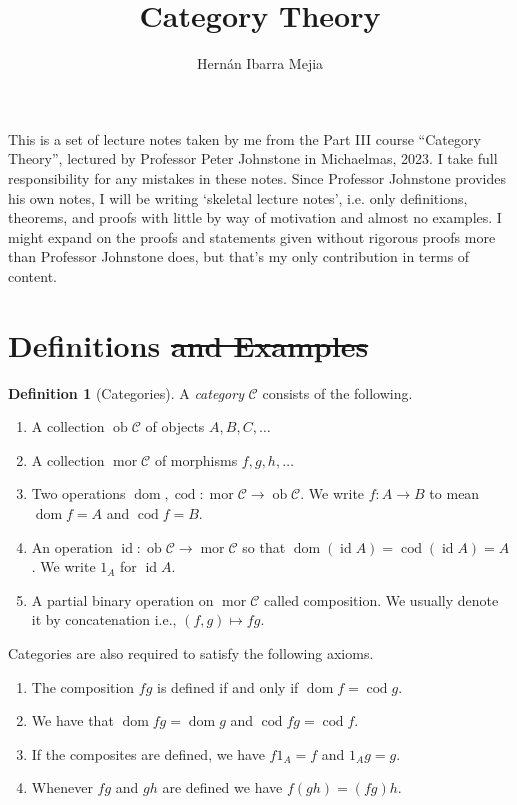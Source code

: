 \documentclass{report}
\DeclareMathOperator{\id}{id}
\DeclareMathOperator{\ob}{ob}
\DeclareMathOperator{\mor}{mor}
\DeclareMathOperator{\dom}{dom}
\DeclareMathOperator{\cod}{cod}
\theoremstyle{definition}
\theoremstyle{plain}
\theoremstyle{definition}
\newtheorem{defn}[thm]{Definition}
\begin{document}
	\title{Category Theory}
	\author{Hernán Ibarra Mejia}
	\maketitle
	This is a set of lecture notes taken by me from the Part III course ``Category Theory'', lectured by Professor Peter Johnstone in Michaelmas, 2023. I take full responsibility for any mistakes in these notes. Since Professor Johnstone provides his own notes, I will be writing `skeletal lecture notes', i.e. only definitions, theorems, and proofs with little by way of motivation and almost no examples. I might expand on the proofs and statements given without rigorous proofs more than Professor Johnstone does, but that's my only contribution in terms of content.
	\section{Definitions \sout{and Examples}}
	\begin{defn}[Categories]
		A \emph{category} $\mathcal{C}$ consists of the following.
		\begin{enumerate}
			\item A collection $\ob \mathcal{C}$ of objects $A,B,C,\ldots$
			\item A collection $\mor \mathcal{C}$ of morphisms $f,g,h,\ldots$
			\item Two operations $\dom,\cod\colon \mor \mathcal{C} \to \ob\mathcal{C}$. We write $f\colon A \to B$ to mean $\dom f =A$ and $\cod f = B$.
			\item An operation $\id \colon \ob \mathcal{C} \to \mor \mathcal{C}$ so that $\dom (\id A) = \cod (\id A) = A$. We write $1_A$ for $\id A$.
			\item A partial binary operation on $\mor \mathcal{C}$ called composition. We usually denote it by concatenation i.e., $(f,g)\mapsto fg$. 
		\end{enumerate}
		Categories are also required to satisfy the following axioms.
		\begin{enumerate}
			\item The composition $fg$ is defined if and only if $\dom f = \cod g$.
			\item We have that $\dom fg = \dom g$ and $\cod fg = \cod f$.
			\item If the composites are defined, we have $f1_A = f$ and $1_Ag = g$. 
			\item Whenever $fg$ and $gh$ are defined we have $f(gh) = (fg)h$.
		\end{enumerate}
	\end{defn}
\end{document}
